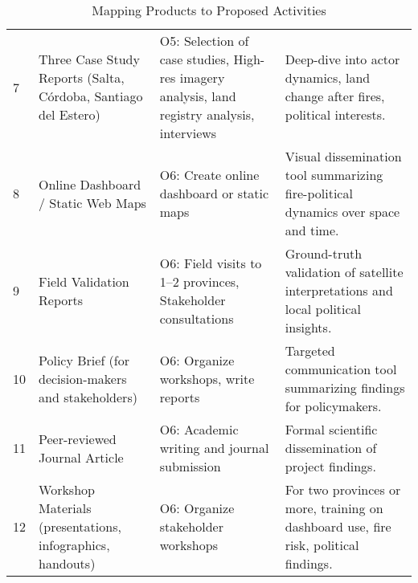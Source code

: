 \begin{table}
\begin{longtable}{@{} p{0.2cm} p{5cm} p{5cm} p{5cm} @{}}
        7 & Three Case Study Reports (Salta, C\'ordoba, Santiago del Estero) & O5: Selection of case studies, High-res imagery analysis, land registry analysis, interviews & Deep-dive into actor dynamics, land change after fires, political interests. \\
        
        8 & Online Dashboard / Static Web Maps & O6: Create online dashboard or static maps & Visual dissemination tool summarizing fire-political dynamics over space and time. \\
        
        9 & Field Validation Reports & O6: Field visits to 1--2 provinces, Stakeholder consultations & Ground-truth validation of satellite interpretations and local political insights. \\
        
        10 & Policy Brief (for decision-makers and stakeholders) & O6: Organize workshops, write reports & Targeted communication tool summarizing findings for policymakers. \\
        
        11 & Peer-reviewed Journal Article & O6: Academic writing and journal submission & Formal scientific dissemination of project findings. \\
        
        12 & Workshop Materials (presentations, infographics, handouts) & O6: Organize stakeholder workshops & For two provinces or more, training on dashboard use, fire risk, political findings. \\
        
    \bottomrule
    \end{longtable}
    \caption{Mapping Products to Proposed Activities}
    \label{tab:results}
\end{table}
